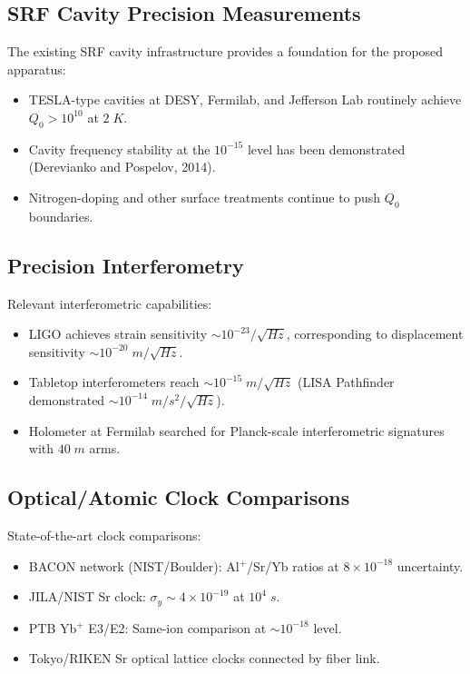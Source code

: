\documentclass[aps,prd,twocolumn,superscriptaddress,nofootinbib]{revtex4-2}
\begin{document}
\subsection{SRF Cavity Precision Measurements}

The existing SRF cavity infrastructure provides a foundation for
the proposed apparatus:
\begin{itemize}
\item TESLA-type cavities at DESY, Fermilab, and Jefferson Lab
routinely achieve $Q_0 > 10^{10}$ at $2\;\si{K}$.
\item Cavity frequency stability at the $10^{-15}$ level has
been demonstrated (Derevianko and Pospelov, 2014).
\item Nitrogen-doping and other surface treatments continue to
push $Q_0$ boundaries.
\end{itemize}

\subsection{Precision Interferometry}

Relevant interferometric capabilities:
\begin{itemize}
\item LIGO achieves strain sensitivity $\sim 10^{-23}/\sqrt{\si{Hz}}$,
corresponding to displacement sensitivity $\sim 10^{-20}\;\si{m/\sqrt{Hz}}$.
\item Tabletop interferometers reach $\sim 10^{-15}\;\si{m/\sqrt{Hz}}$
(LISA Pathfinder demonstrated $\sim 10^{-14}\;\si{m/s^2/\sqrt{Hz}}$).
\item Holometer at Fermilab searched for Planck-scale
interferometric signatures with $40\;\si{m}$ arms.
\end{itemize}

\subsection{Optical/Atomic Clock Comparisons}

State-of-the-art clock comparisons:
\begin{itemize}
\item BACON network (NIST/Boulder): Al$^+$/Sr/Yb ratios at
$8 \times 10^{-18}$ uncertainty.
\item JILA/NIST Sr clock: $\sigma_y \sim 4 \times 10^{-19}$
at $10^4\;\si{s}$.
\item PTB Yb$^+$ E3/E2: Same-ion comparison at
$\sim 10^{-18}$ level.
\item Tokyo/RIKEN Sr optical lattice clocks connected by
fiber link.
\end{itemize}
\end{document}
